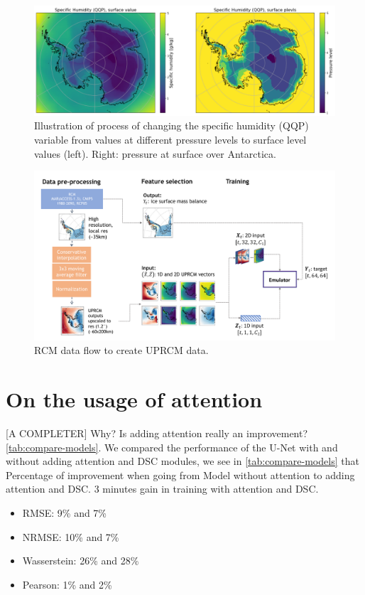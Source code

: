 \documentclass[a4paper,11pt,oneside]{report}
\begin{document}
\begin{figure}[!htb]
  \centering
  \includegraphics[width=\columnwidth]{doc/Thesis-latex/images/example-plevels.pdf}
  \caption []{\small Illustration of process of changing the specific humidity (QQP) variable from values at different pressure levels to surface level values (left). Right: pressure at surface over Antarctica. }
  \vspace{-3mm}
  \label{fig:example-plevels}
\end{figure}



\begin{figure}[!htb]
  \centering
  \includegraphics[width=\columnwidth]{images/data-flow.pdf}
  \caption []{\small RCM data flow to create UPRCM data.}
  \vspace{-3mm}
  \label{fig:training-data-flow}
\end{figure}

\section{On the usage of attention}
[A COMPLETER] Why? Is adding attention really an improvement? \autoref{tab:compare-models}. We compared the performance of the U-Net with and without adding attention and DSC modules, we see in \autoref{tab:compare-models} that 
Percentage of improvement when going from Model without attention to adding attention and DSC. 3 minutes gain in training with attention and DSC.
\begin{itemize}
    \item RMSE: 9\% and 7\%
    \item NRMSE: 10\% and 7\%
    \item Wasserstein: 26\% and 28\%
    \item Pearson: 1\% and 2\% 
\end{itemize}

\newpage
\begin{landscape}

\end{landscape}
\end{document}
